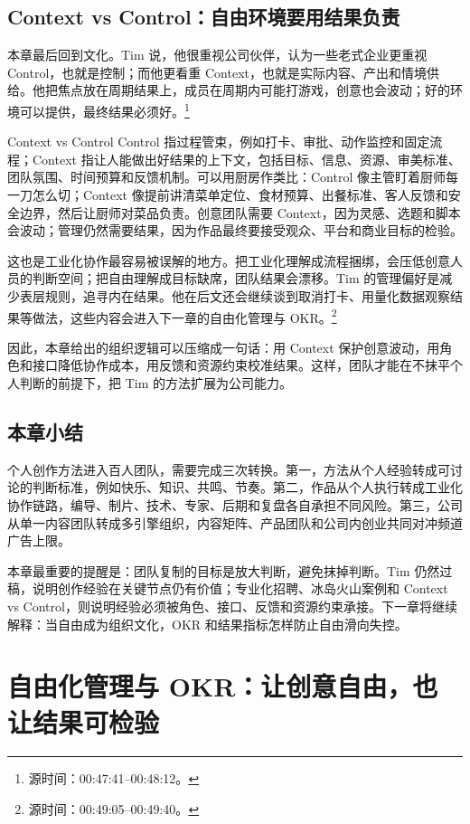 \documentclass[a4paper]{article}
\begin{document}
\subsection{Context vs Control：自由环境要用结果负责}

本章最后回到文化。Tim 说，他很重视公司伙伴，认为一些老式企业更重视 Control，也就是控制；而他更看重 Context，也就是实际内容、产出和情境供给。他把焦点放在周期结果上，成员在周期内可能打游戏，创意也会波动；好的环境可以提供，最终结果必须好。\footnote{源时间：00:47:41--00:48:12。}

\begin{knowledgebox}{Context vs Control}
Control 指过程管束，例如打卡、审批、动作监控和固定流程；Context 指让人能做出好结果的上下文，包括目标、信息、资源、审美标准、团队氛围、时间预算和反馈机制。可以用厨房作类比：Control 像主管盯着厨师每一刀怎么切；Context 像提前讲清菜单定位、食材预算、出餐标准、客人反馈和安全边界，然后让厨师对菜品负责。创意团队需要 Context，因为灵感、选题和脚本会波动；管理仍然需要结果，因为作品最终要接受观众、平台和商业目标的检验。
\end{knowledgebox}

这也是工业化协作最容易被误解的地方。把工业化理解成流程捆绑，会压低创意人员的判断空间；把自由理解成目标缺席，团队结果会漂移。Tim 的管理偏好是减少表层规则，追寻内在结果。他在后文还会继续谈到取消打卡、用量化数据观察结果等做法，这些内容会进入下一章的自由化管理与 OKR。\footnote{源时间：00:49:05--00:49:40。}

因此，本章给出的组织逻辑可以压缩成一句话：用 Context 保护创意波动，用角色和接口降低协作成本，用反馈和资源约束校准结果。这样，团队才能在不抹平个人判断的前提下，把 Tim 的方法扩展为公司能力。

\subsection{本章小结}

个人创作方法进入百人团队，需要完成三次转换。第一，方法从个人经验转成可讨论的判断标准，例如快乐、知识、共鸣、节奏。第二，作品从个人执行转成工业化协作链路，编导、制片、技术、专家、后期和复盘各自承担不同风险。第三，公司从单一内容团队转成多引擎组织，内容矩阵、产品团队和公司内创业共同对冲频道广告上限。

本章最重要的提醒是：团队复制的目标是放大判断，避免抹掉判断。Tim 仍然过稿，说明创作经验在关键节点仍有价值；专业化招聘、冰岛火山案例和 Context vs Control，则说明经验必须被角色、接口、反馈和资源约束承接。下一章将继续解释：当自由成为组织文化，OKR 和结果指标怎样防止自由滑向失控。
\section{自由化管理与 OKR：让创意自由，也让结果可检验}
\end{document}
